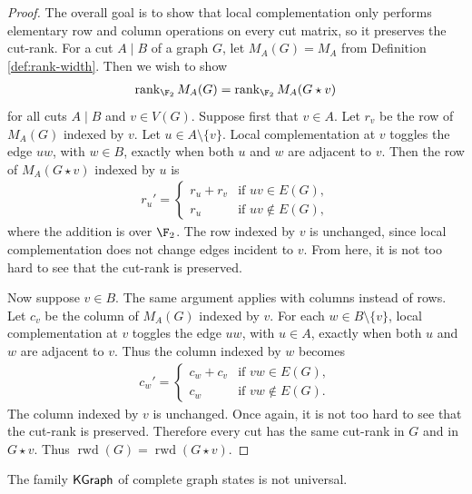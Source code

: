 \begin{proof}
The overall goal is to show that local complementation only performs elementary row and column operations on every cut matrix, so it preserves the cut-rank. For a cut $A \mid B$ of a graph $G$, let $M_A(G) = M_A$ from Definition \ref{def:rank-width}. Then we wish to show
\begin{align}
    \rank_{\F_2} M_A(G) = \rank_{\F_2} M_A(G \star v)
\end{align}
for all cuts $A \mid B$ and $v \in V(G)$. Suppose first that $v \in A$. Let $r_v$ be the row of $M_A(G)$ indexed by
$v$. Let $u \in A \setminus \{v\}$. Local complementation at $v$ toggles the
edge $uw$, with $w \in B$, exactly when both $u$ and $w$ are adjacent to
$v$. Then the row of $M_A(G \star v)$ indexed by $u$ is
\begin{align}
    r_u'
    =
    \begin{cases}
        r_u + r_v & \text{if } uv \in E(G),\\
        r_u & \text{if } uv \notin E(G),
    \end{cases}
\end{align}
where the addition is over $\F_2$. The row indexed by $v$ is unchanged,
since local complementation does not change edges incident to $v$. From here, it is not too hard to see that the cut-rank is preserved.

Now suppose $v \in B$. The same argument applies with columns instead of
rows. Let $c_v$ be the column of $M_A(G)$ indexed by $v$. For each
$w \in B \setminus \{v\}$, local complementation at $v$ toggles the edge
$uw$, with $u \in A$, exactly when both $u$ and $w$ are adjacent to $v$.
Thus the column indexed by $w$ becomes
\begin{align}
    c_w'
    =
    \begin{cases}
        c_w + c_v & \text{if } vw \in E(G),\\
        c_w & \text{if } vw \notin E(G).
    \end{cases}
\end{align}
The column indexed by $v$ is unchanged. Once again, it is not too hard to see that the cut-rank is preserved.
Therefore every cut has the same cut-rank in $G$ and in $G \star v$. Thus
$
    \operatorname{rwd}(G)
    =
    \operatorname{rwd}(G \star v).
$
\end{proof}

\begin{theorem}
\label{thm:complete-not-universal}
The family $\mathsf{KGraph}$ of complete graph states is not universal. 
\end{theorem}

